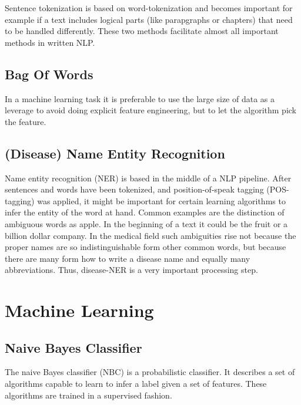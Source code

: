 Sentence tokenization is based on word-tokenization and becomes important for example if a text
includes logical parts (like parapgraphs or chapters) that need to be handled differently.
These two methods facilitate almost all important methods in written NLP.

\subsection{Bag Of Words}
In a machine learning task it is preferable to use the large size of data as a leverage to avoid
doing explicit feature engineering, but to let the algorithm pick the feature.

\subsection{(Disease) Name Entity Recognition}
Name entity recognition (NER) is based in the middle of a NLP pipeline. After
sentences and words have been tokenized, and position-of-speak tagging (POS-
tagging) was applied, it might be important for certain learning algorithms to
infer the entity of the word at hand. Common examples are the distinction of
ambiguous words as apple. In the beginning of a text it could be the fruit or a
billion dollar company.
In the medical field such ambiguities rise not because the proper names are so
indistinguishable form other common words, but because there are many form
how to write a disease name and equally many abbreviations. Thus, disease-NER
is a very important processing step.

\section{Machine Learning}

\subsection{Naive Bayes Classifier}
The naive Bayes classifier (NBC) is a probabilistic classifier. It describes a set
of algorithms capable to learn to infer a label given a set of features. These
algorithms are trained in a supervised fashion.
